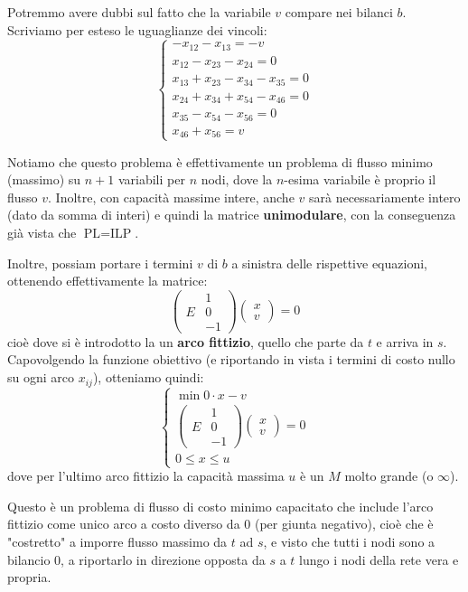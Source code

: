 \documentclass[a4paper,11pt]{article}
\begin{document}
Potremmo avere dubbi sul fatto che la  variabile $v$ compare nei bilanci $b$.
Scriviamo per esteso le uguaglianze dei vincoli:
\[
	\begin{cases}
		-x_{12} - x_{13} = -v \\ 
		x_{12} - x_{23} - x_{24} = 0 \\ 
		x_{13} + x_{23} - x_{34} - x_{35} = 0 \\ 
		x_{24} + x_{34} + x_{54} - x_{46} = 0 \\ 
		x_{35} - x_{54} - x_{56} = 0 \\ 
		x_{46} + x_{56} = v
	\end{cases}
\]

Notiamo che questo problema è effettivamente un problema di flusso minimo (massimo) su $n+1$ variabili per $n$ nodi, dove la $n$-esima variabile è proprio il flusso $v$.
Inoltre, con capacità massime intere, anche $v$ sarà necessariamente intero (dato da somma di interi) e quindi la matrice \textbf{unimodulare}, con la conseguenza già vista che $\text{PL} = \text{ILP}$.

Inoltre, possiam portare i termini $v$ di $b$ a sinistra delle rispettive equazioni, ottenendo effettivamente la matrice:
$$
\begin{pmatrix}
 & 1 \\ 
E & 0 \\ 
 & -1
\end{pmatrix}
\begin{pmatrix}
x \\ v
\end{pmatrix}
= 0
$$
cioè dove si è introdotto la un \textbf{arco fittizio}, quello che parte da $t$ e arriva in $s$.
Capovolgendo la funzione obiettivo (e riportando in vista i termini di costo nullo su ogni arco $x_{ij}$), otteniamo quindi:
\[
	\begin{cases}
		\min 0 \cdot x - v \\ 	
\begin{pmatrix}
 & 1 \\ 
E & 0 \\ 
 & -1
\end{pmatrix}
\begin{pmatrix}
x \\ v
\end{pmatrix}
= 0 \\ 
0 \leq x \leq u
	\end{cases}
\]
dove per l'ultimo arco fittizio la capacità massima $u$ è un $M$ molto grande (o $\infty$).

Questo è un problema di flusso di costo minimo capacitato che include l'arco fittizio come unico arco a costo diverso da 0 (per giunta negativo), cioè che è "costretto" a imporre flusso massimo da $t$ ad $s$, e visto che tutti i nodi sono a bilancio 0, a riportarlo in direzione opposta da $s$ a $t$ lungo i nodi della rete vera e propria.
\end{document}
